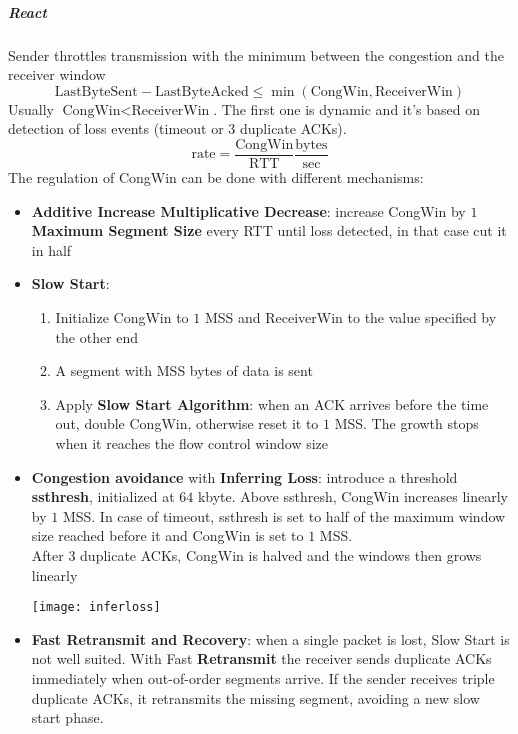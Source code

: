 \subparagraph{React} Sender throttles transmission with the minimum between the congestion and the receiver window
\begin{equation*}
	\text{LastByteSent} - \text{LastByteAcked} \leq \min(\text{CongWin}, \text{ReceiverWin})
\end{equation*}
Usually $\text{CongWin} < \text{ReceiverWin}$. The first one is dynamic and it's based on detection of loss events (timeout or 3 duplicate ACKs).
\begin{equation*}
	\text{rate} = \frac{\text{CongWin}}{\text{RTT}} \frac{\text{bytes}}{\text{sec}}
\end{equation*}
The regulation of CongWin can be done with different mechanisms:
\begin{itemize}
	\item \textbf{Additive Increase Multiplicative Decrease}: increase CongWin by $1$ \textbf{Maximum Segment Size} every RTT until loss detected, in that case cut it in half
	\item \textbf{Slow Start}:
	\begin{enumerate}
		\item Initialize CongWin to $1$ MSS and ReceiverWin to the value specified by the other end
		\item A segment with MSS bytes of data is sent
		\item Apply \textbf{Slow Start Algorithm}: when an ACK arrives before the time out, double CongWin, otherwise reset it to $1$ MSS. The growth stops when it reaches the flow control window size
	\end{enumerate}
	\item \textbf{Congestion avoidance} with \textbf{Inferring Loss}: introduce a threshold \textbf{ssthresh}, initialized at $64$ kbyte. Above ssthresh, CongWin increases linearly by $1$ MSS. In case of timeout, ssthresh is set to half of the maximum window size reached before it and CongWin is set to $1$ MSS.\\
	After $3$ duplicate ACKs, CongWin is halved and the windows then grows linearly
	\begin{center}
		\texttt{[image: inferloss]}
	\end{center}
	\item \textbf{Fast Retransmit and Recovery}: when a single packet is lost, Slow Start is not well suited. With Fast \textbf{Retransmit} the receiver sends duplicate ACKs immediately when out-of-order segments arrive. If the sender receives triple duplicate ACKs, it retransmits the missing segment, avoiding a new slow start phase.\\

\end{itemize}
